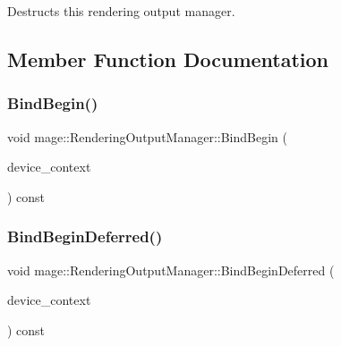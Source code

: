 Destructs this rendering output manager. 

\subsection{Member Function Documentation}
\hypertarget{classmage_1_1_rendering_output_manager_a6b4feb9065e783da578670ee76b9eef1}{}\label{classmage_1_1_rendering_output_manager_a6b4feb9065e783da578670ee76b9eef1} 
\subsubsection{\texorpdfstring{Bind\+Begin()}{BindBegin()}}
{\footnotesize\ttfamily void mage\+::\+Rendering\+Output\+Manager\+::\+Bind\+Begin (\begin{DoxyParamCaption}\item[{I\+D3\+D11\+Device\+Context2 $\ast$}]{device\+\_\+context }\end{DoxyParamCaption}) const\hspace{0.3cm}{\ttfamily [noexcept]}}

\hypertarget{classmage_1_1_rendering_output_manager_a2f4c24f11b7a1821e3d73d94d1147f56}{}\label{classmage_1_1_rendering_output_manager_a2f4c24f11b7a1821e3d73d94d1147f56} 
\subsubsection{\texorpdfstring{Bind\+Begin\+Deferred()}{BindBeginDeferred()}}
{\footnotesize\ttfamily void mage\+::\+Rendering\+Output\+Manager\+::\+Bind\+Begin\+Deferred (\begin{DoxyParamCaption}\item[{I\+D3\+D11\+Device\+Context2 $\ast$}]{device\+\_\+context }\end{DoxyParamCaption}) const\hspace{0.3cm}{\ttfamily [noexcept]}}

\hypertarget{classmage_1_1_rendering_output_manager_a599522abd660e0bf497c0d9066c5dbbe}{}\label{classmage_1_1_rendering_output_manager_a599522abd660e0bf497c0d9066c5dbbe} 

